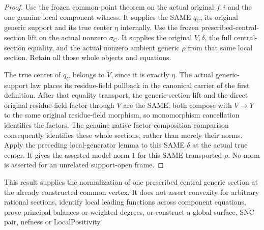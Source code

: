 \begin{proof}
Use the frozen common-point theorem on the actual original $f,i$ and the
one genuine local component witness. It supplies the SAME $q_C$, its
original generic support and its true center $\eta$ internally.
Use the frozen prescribed-central-section lift on the actual nonzero
$\sigma_C$. It supplies the original $V,\delta$, the full central-section
equality, and the actual nonzero ambient generic $\rho$ from that same
local section. Retain all those whole objects and equations.

The true center of $q_C$ belongs to $V$, since it is exactly $\eta$.
The actual generic-support law places its residue-field pullback in the
canonical carrier of the first definition. After that equality transport,
the generic-section lift and the direct original residue-field factor
through $V$ are the SAME: both compose with $V\to Y$ to the same original
residue-field morphism, so monomorphism cancellation identifies the factors.
The genuine native factor-composition comparison consequently identifies
these whole sections, rather than merely their norms. Apply the preceding
local-generator lemma to this SAME $\delta$ at the actual true center.
It gives the asserted model norm $1$ for this SAME transported $\rho$.
No norm is asserted for an unrelated support-open frame.
\end{proof}

This result supplies the normalization of one prescribed central generic
section at the already constructed common vertex. It does not assert
convexity for arbitrary rational sections, identify local leading functions
across component equations, prove principal balances or weighted degrees,
or construct a global surface, SNC pair, nefness or LocalPositivity.
